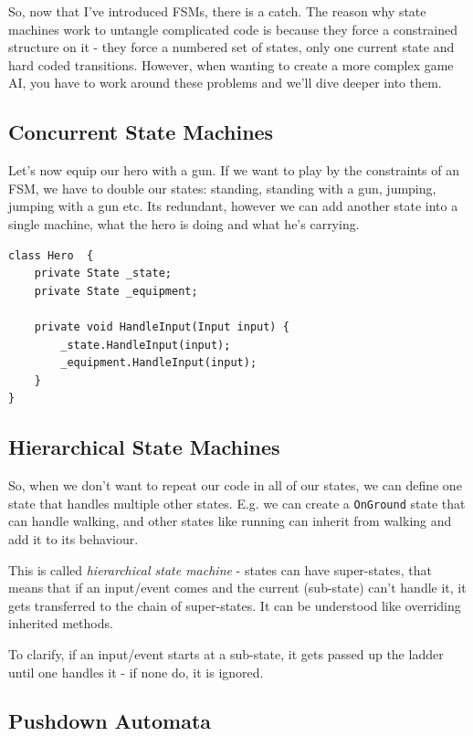 \documentclass[a4paper, 12pt]{book}
\begin{document}
So, now that I've introduced FSMs, there is a catch. 
The reason why state machines work to untangle complicated code is because they force a constrained structure on it - they force a numbered set of states, only one current state and hard coded transitions. However, when wanting to create a more complex game AI, you have to work around these problems and we'll dive deeper into them. 

\subsection{Concurrent State Machines}

Let's now equip our hero with a gun. If we want to play by the constraints of an FSM, we have to double our states: standing, standing with a gun, jumping, jumping with a gun etc. Its redundant, however we can add another state into a single machine, what the hero is doing and what he's carrying.

\begin{verbatim}
class Hero  {
    private State _state;
    private State _equipment;

    private void HandleInput(Input input) {
        _state.HandleInput(input);
        _equipment.HandleInput(input);
    }
}
\end{verbatim}

\subsection{Hierarchical State Machines}

So, when we don't want to repeat our code in all of our states, we can define one state that handles multiple other states. E.g. we can create a \texttt{OnGround} state that can handle walking, and other states like running can inherit from walking and add it to its behaviour.


This is called \emph{hierarchical state machine} - states can have super-states, that means that if an input/event comes and the current (sub-state) can't handle it, it gets transferred to the chain of super-states. It can be understood like overriding inherited methods.

To clarify, if an input/event starts at a sub-state, it gets passed up the ladder until one handles it - if none do, it is ignored.

\subsection{Pushdown Automata}
\end{document}
